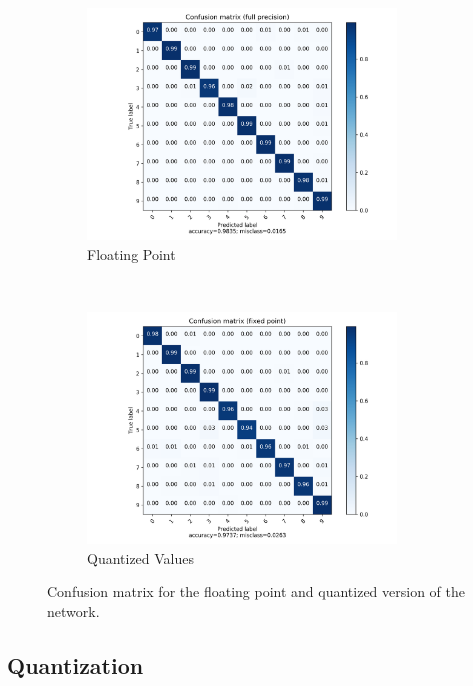 \begin{figure}[hbtp]
\centering
\begin{subfigure}[t]{0.5\textwidth}
	\includegraphics[width=0.9\textwidth]{../../net/images/cm}
	\caption{Floating Point}
	\label{fig:network-test-cm}
\end{subfigure}%
~
\begin{subfigure}[t]{0.5\textwidth}
	\includegraphics[width=0.9\textwidth]{../../net/images/qcm}
	\caption{Quantized Values}
	\label{fig:network-test-qcm}
\end{subfigure}
\caption{Confusion matrix for the floating point and quantized version of the network.}
\label{fig:network-confusion-matrix}
\end{figure}


\subsection{Quantization}
\label{sec:nn-quant}

